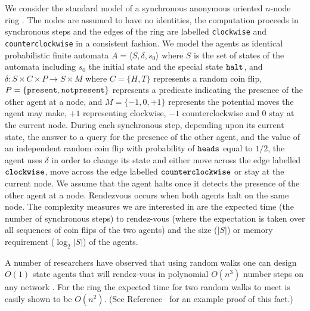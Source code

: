 \documentclass{patmorin}
\begin{document}
We consider the standard model of a synchronous anonymous oriented
$n$-node ring \cite{santoro}. The nodes are assumed to have no identities,
the computation proceeds in synchronous steps and the edges of the ring
are labelled {\tt clockwise} and {\tt counterclockwise} in a consistent
fashion.  We model the agents as identical probabilistic finite automata
$A = \langle S, \delta, s_0 \rangle$ where $S$ is the set of states of
the automata including $s_0$ the initial state and the special state ${\tt
halt}$, and $\delta:S \times C \times P \to S \times M$ where $C = \{ H,
T \}$ represents a random coin flip, $P = \{ \tt present, notpresent \}$
represents a predicate indicating the presence of the other agent at a
node, and $M = \{ -1, 0, +1 \}$ represents the potential moves the agent
may make, $+1$ representing clockwise, $-1$ counterclockwise and $0$
stay at the current node.  During each synchronous step, depending upon
its current state, the answer to a query for the presence of the other
agent, and the value of an independent random coin flip with probability
of $\tt heads$ equal to $1/2$, the agent uses $\delta$ in order to change
its state and either move across the edge labelled $\tt clockwise$, move
across the edge labelled $\tt counterclockwise$ or stay at the current
node. We assume that the agent halts once it detects the presence of
the other agent at a node.  Rendezvous occurs when both agents halt on
the same node.  The complexity measures  we are interested in are the
expected time (the number of synchronous steps) to rendez-vous (where the
expectation is taken over all sequences of coin flips of the two agents)
and the size ($|S|$) or memory requirement ($\log_2 |S|$) of the agents.

A number of researchers have observed that using random walks one can
design $O(1)$ state agents that will rendez-vous in polynomial $O(n^3)$
number steps on any network \cite{coppersmith}. For the ring the expected
time for two random walks to meet is easily shown to be $O(n^2)$. (See
Reference~\cite{kk} for an example proof of this fact.)
\end{document}
